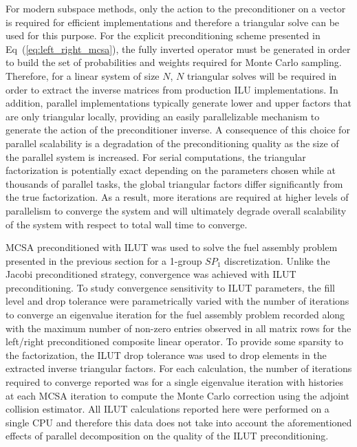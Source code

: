 For modern subspace methods, only the action to the preconditioner on
a vector is required for efficient implementations and therefore a
triangular solve can be used for this purpose. For the explicit
preconditioning scheme presented in Eq~(\ref{eq:left_right_mcsa}), the
fully inverted operator must be generated in order to build the set of
probabilities and weights required for Monte Carlo
sampling. Therefore, for a linear system of size $N$, $N$ triangular
solves will be required in order to extract the inverse matrices from
production ILU implementations. In addition, parallel implementations
typically generate lower and upper factors that are only triangular
locally, providing an easily parallelizable mechanism to generate the
action of the preconditioner inverse. A consequence of this choice for
parallel scalability is a degradation of the preconditioning quality
as the size of the parallel system is increased. For serial
computations, the triangular factorization is potentially exact
depending on the parameters chosen while at thousands of parallel
tasks, the global triangular factors differ significantly from the true
factorization. As a result, more iterations are required at higher
levels of parallelism to converge the system and will ultimately
degrade overall scalability of the system with respect to total wall
time to converge.

MCSA preconditioned with ILUT was used to solve the fuel assembly
problem presented in the previous section for a 1-group $SP_1$
discretization. Unlike the Jacobi preconditioned strategy, convergence
was achieved with ILUT preconditioning. To study convergence
sensitivity to ILUT parameters, the fill level and drop tolerance were
parametrically varied with the number of iterations to converge an
eigenvalue iteration for the fuel assembly problem recorded along with
the maximum number of non-zero entries observed in all matrix rows for
the left/right preconditioned composite linear operator. To provide
some sparsity to the factorization, the ILUT drop tolerance was used
to drop elements in the extracted inverse triangular factors. For each
calculation, the number of iterations required to converge reported
was for a single eigenvalue iteration with  histories at each
MCSA iteration to compute the Monte Carlo correction using the adjoint
collision estimator. All ILUT calculations reported here were
performed on a single CPU and therefore this data does not take into
account the aforementioned effects of parallel decomposition on the
quality of the ILUT preconditioning.

